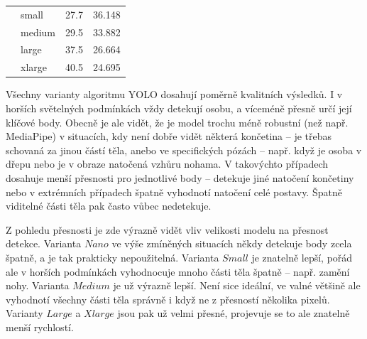 \begin{table}[htbp]
\begin{tabular}{|c|l|l|l|}
                                           & small          & 27.7                    & 36.148                   \\ \cline{2-4}
                                           & medium         & 29.5                    & 33.882                   \\ \cline{2-4}
                                           & large          & 37.5                    & 26.664                   \\ \cline{2-4}
                                           & xlarge         & 40.5                    & 24.695                   \\ \hline
    \end{tabular}
\end{table}

Všechny varianty algoritmu YOLO dosahují poměrně kvalitních výsledků. I v
horších světelných podmínkách vždy detekují osobu, a víceméně přesně určí její
klíčové body. Obecně je ale vidět, že je model trochu méně robustní (než např.
MediaPipe) v situacích, kdy není dobře vidět některá končetina – je třebas
schovaná za jinou částí těla, anebo ve specifických pózách – např. když je
osoba v dřepu nebo je v obraze natočená vzhůru nohama. V takovýchto případech
dosahuje menší přesnosti pro jednotlivé body – detekuje jiné natočení končetiny
nebo v extrémních případech špatně vyhodnotí natočení celé postavy. Špatně
viditelné části těla pak často vůbec nedetekuje.

Z pohledu přesnosti je zde výrazně vidět vliv velikosti modelu na přesnost
detekce. Varianta $Nano$ ve výše zmíněných situacích někdy detekuje body zcela
špatně, a je tak prakticky nepoužitelná. Varianta $Small$ je znatelně lepší,
pořád ale v horších podmínkách vyhodnocuje mnoho části těla špatně – např.
zamění nohy. Varianta $Medium$ je už výrazně lepší. Není sice ideální, ve valné
většině ale vyhodnotí všechny části těla správně i když ne z přesností několika
pixelů. Varianty $Large$ a $Xlarge$ jsou pak už velmi přesné, projevuje se to
ale znatelně menší rychlostí.

